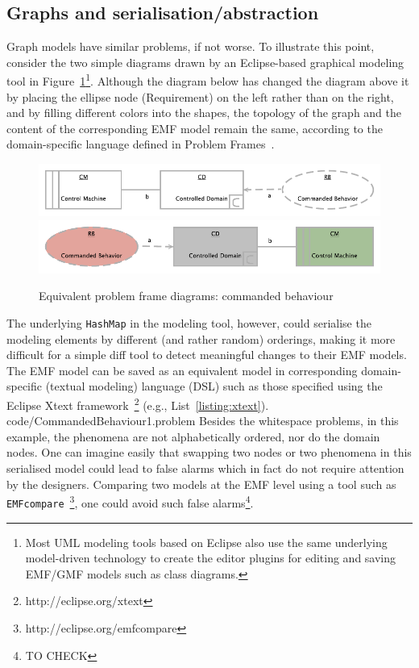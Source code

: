 \documentclass{acm_proc_article-sp}
\begin{document}
\subsection{Graphs and serialisation/abstraction}
Graph models have similar problems, if not worse. To illustrate this point, consider the two simple diagrams drawn by an Eclipse-based graphical modeling tool in Figure~\ref{fig:1}\footnote{Most UML modeling tools based on Eclipse also use the same underlying model-driven technology to create the editor plugins for editing and saving EMF/GMF models such as class diagrams.}.
Although the diagram below has changed the diagram above it by placing the ellipse node (Requirement) on the left rather than on the right, and by filling different colors into the shapes, the topology of the graph and the content of the corresponding EMF model remain the same, according to the domain-specific language defined in Problem Frames~\cite{jackson01}.
\begin{figure}
\includegraphics[width=\columnwidth]{code/CommandedBehaviour1}
\includegraphics[width=\columnwidth]{code/CommandedBehaviour2}
\caption{Equivalent problem frame diagrams: commanded behaviour}\label{fig:1}
\end{figure}

The underlying {\tt HashMap} in the modeling tool, however, could serialise the modeling elements by different (and rather random) orderings, making it more difficult for a simple diff tool to detect meaningful changes to their EMF models. The EMF model can be saved as an equivalent model in corresponding domain-specific (textual modeling) language (DSL) such as those specified using the Eclipse Xtext framework~\footnote{http://eclipse.org/xtext} (e.g., List~\ref{listing:xtext}). 
  {code/CommandedBehaviour1.problem}
Besides the whitespace problems, in this example, the phenomena are not alphabetically ordered, nor do the domain nodes. 
One can imagine easily that swapping two nodes or two phenomena in this serialised model could lead to false alarms which in fact do not require attention by the designers. Comparing two models at the EMF level using a tool such as {\tt EMFcompare}~\footnote{http://eclipse.org/emfcompare}, one could avoid such false alarms\footnote{TO CHECK}.
\end{document}
